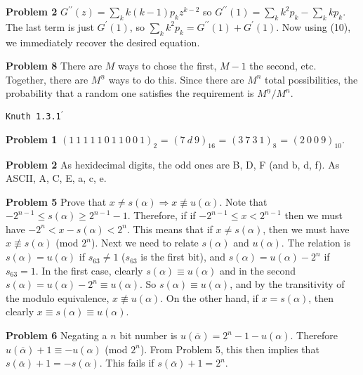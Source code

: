 \vskip 0.1in
\noindent
{\bf Problem 2} $G^{\prime\prime} \left(z\right)= \sum_k k \left(k - 1\right) p_k z^{k-2}$ so
 $G^{\prime\prime} \left(1\right) = \sum_k k^2 p_k - \sum_k k p_k.$  The last term is just 
 $G^{\prime} \left(1\right)$, so $\sum_k k^2 p_k = G^{\prime\prime} \left(1\right) + G^{\prime}
  \left(1\right).$  Now using (10), we immediately recover the desired equation.
  
\vskip 0.1in
\noindent
{\bf Problem 8} There are $M$ ways to chose the first, $M-1$ the second, etc.  Together, there are
 $M^{\underline n}$ ways to do this.  Since there are $M^n$ total possibilities, the probability
 that a random one satisfies the requirement is $M^{\underline n} / M^n$.
 
\vskip 0.5in
\centerline{\tt Knuth 1.3.1$^{\prime}$}
\vskip 0.5in

\noindent
{\bf Problem 1} $\left(1\ 1\ 1\ 1\ 1\ 0\ 1\ 1\ 0\ 0\ 1\right)_2$ = $\left(7\ d\ 9 \right)_{16}$ = 
 $\left(3\ 7\ 3\ 1\right)_8$ = $\left(2\ 0\ 0\ 9\right)_{10}$.
 
 \vskip 0.1in
 \noindent
 {\bf Problem 2} As hexidecimal digits, the odd ones are B, D, F (and b, d, f).
  As ASCII, A, C, E, a, c, e.

\vskip 0.1in
\noindent
{\bf Problem 5} Prove that $x \neq s\left(\alpha\right)  \Rightarrow x \not\equiv u\left(\alpha\right)$.
Note that $-2^{n-1} \le s\left(\alpha\right) \ge 2^{n-1}-1$.  Therefore, if
if $-2^{n-1} \le x < 2^{n-1}$ then we must have $-2^n < x - s\left(\alpha\right) < 2^n$.
This means that if $x \neq s\left(\alpha\right)$, then we must have
$x \not\equiv s\left(\alpha\right)$ (mod $2^n$).  Next we need to relate 
$s\left(\alpha\right)$ and $u\left( \alpha \right)$.  The relation is
$s\left(\alpha\right) = u\left(\alpha\right)$ if $s_{63} \neq 1$ ($s_{63}$ is the first
bit), and $s\left(\alpha\right) = u\left(\alpha\right)-2^n$ if $s_{63} = 1$.
In the first case, clearly $s\left(\alpha\right) \equiv u\left(\alpha\right)$ and
in the second $s \left( \alpha \right) = u\left(\alpha\right) - 2^n \equiv u \left(\alpha\right)$.
So $s\left( \alpha \right) \equiv u\left(\alpha\right)$, and by the transitivity of
the modulo equivalence, $x \not\equiv u\left(\alpha\right)$.  On the other hand,
if $x = s \left(\alpha\right)$, then clearly $x \equiv s \left( \alpha \right) \equiv u \left( \alpha \right)$.

\vskip 0.1in
\noindent
{\bf Problem 6} Negating a $n$ bit number is $u\left( \overline \alpha \right) = 2^n - 1 - 
u \left( \alpha \right)$.  Therefore $u \left( \overline \alpha \right) + 1 \equiv - u \left( \alpha \right)$
(mod $2^n$).  From Problem 5, this then implies that $s \left( \overline \alpha \right) + 1 =
- s \left( \alpha \right)$.  This fails if $s \left( \overline \alpha \right) + 1 = 2^n$.

